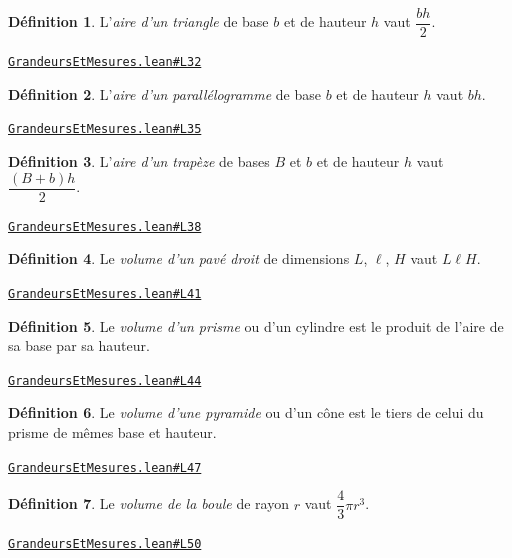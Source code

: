 \documentclass[11pt,a4paper]{article}
\theoremstyle{definition}
\newtheorem{definition}{Définition}
\theoremstyle{plain}
\newcommand{\source}[2]{\par\smallskip\noindent\hfill{\footnotesize\href{#1}{\texttt{#2}}}\par\smallskip}
\begin{document}
\begin{definition}
L'\emph{aire d'un triangle} de base $b$ et de hauteur $h$ vaut $\dfrac{bh}{2}$.
\end{definition}
\source{https://github.com/Commutator-IO/learn-lean/blob/main/cours/01-college/04-grandeurs-et-mesures/GrandeursEtMesures.lean\#L32}{GrandeursEtMesures.lean\#L32}

\begin{definition}
L'\emph{aire d'un parallélogramme} de base $b$ et de hauteur $h$ vaut $bh$.
\end{definition}
\source{https://github.com/Commutator-IO/learn-lean/blob/main/cours/01-college/04-grandeurs-et-mesures/GrandeursEtMesures.lean\#L35}{GrandeursEtMesures.lean\#L35}

\begin{definition}
L'\emph{aire d'un trapèze} de bases $B$ et $b$ et de hauteur $h$ vaut
$\dfrac{(B + b)h}{2}$.
\end{definition}
\source{https://github.com/Commutator-IO/learn-lean/blob/main/cours/01-college/04-grandeurs-et-mesures/GrandeursEtMesures.lean\#L38}{GrandeursEtMesures.lean\#L38}

\begin{definition}
Le \emph{volume d'un pavé droit} de dimensions $L$, $\ell$, $H$ vaut $L\ell H$.
\end{definition}
\source{https://github.com/Commutator-IO/learn-lean/blob/main/cours/01-college/04-grandeurs-et-mesures/GrandeursEtMesures.lean\#L41}{GrandeursEtMesures.lean\#L41}

\begin{definition}
Le \emph{volume d'un prisme} ou d'un cylindre est le produit de l'aire de sa base par
sa hauteur.
\end{definition}
\source{https://github.com/Commutator-IO/learn-lean/blob/main/cours/01-college/04-grandeurs-et-mesures/GrandeursEtMesures.lean\#L44}{GrandeursEtMesures.lean\#L44}

\begin{definition}
Le \emph{volume d'une pyramide} ou d'un cône est le tiers de celui du prisme de mêmes
base et hauteur.
\end{definition}
\source{https://github.com/Commutator-IO/learn-lean/blob/main/cours/01-college/04-grandeurs-et-mesures/GrandeursEtMesures.lean\#L47}{GrandeursEtMesures.lean\#L47}

\begin{definition}
Le \emph{volume de la boule} de rayon $r$ vaut $\dfrac{4}{3}\pi r^3$.
\end{definition}
\source{https://github.com/Commutator-IO/learn-lean/blob/main/cours/01-college/04-grandeurs-et-mesures/GrandeursEtMesures.lean\#L50}{GrandeursEtMesures.lean\#L50}
\end{document}
